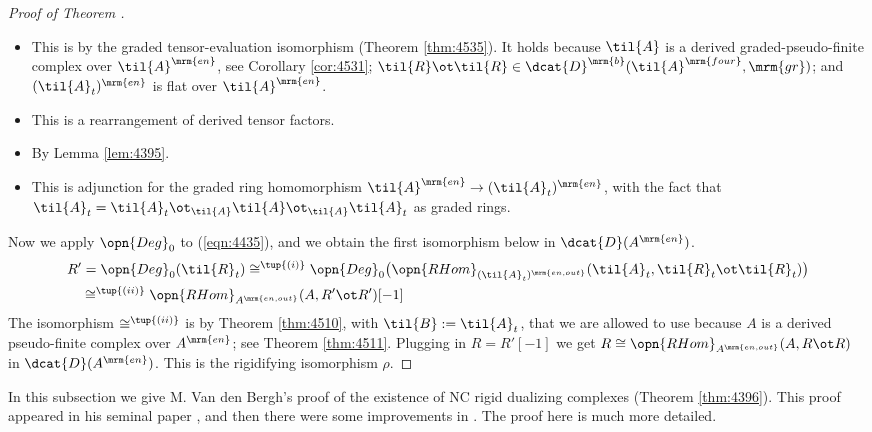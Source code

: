\begin{proof}[Proof of Theorem \tup{\ref{thm:4395}}]
\begin{itemize}
\item[$\cong^{2}$~:] This is by the graded tensor-evaluation 
isomorphism (Theorem \ref{thm:4535}). It holds because $\til{A}$ is
a derived graded-pseudo-finite complex over $\til{A}^{\mrm{en}}$,
see Corollary \ref{cor:4531}; 
$\til{R} \ot \til{R} \in \dcat{D}^{\mrm{b}}(\til{A}^{\mrm{four}}, \mrm{gr})$;
and $(\til{A}_t)^{\mrm{en}}$ is flat over $\til{A}^{\mrm{en}}$.

\item[$\cong^{3}$~:] This is a rearrangement of derived tensor factors. 

\item[$\cong^{4}$~:] By Lemma \ref{lem:4395}. 

\item[$\cong^{5}$~:] This is adjunction for the graded ring homomorphism 
$\til{A}^{\mrm{en}} \to (\til{A}_t)^{\mrm{en}}$, with the fact that 
$\til{A}_t = \til{A}_t \ot_{\til{A}} \til{A} \ot_{\til{A}} \til{A}_t$ as graded 
rings.
\end{itemize}

Now we apply $\opn{Deg}_0$ to (\ref{eqn:4435}), 
and we obtain the first isomorphism below in $\dcat{D}(A^{\mrm{en}})$.
\begin{equation} \label{eqn:4436}
\begin{aligned}
& 
R' = \opn{Deg}_0(\til{R}_t) \cong^{\tup{(i)}} 
\opn{Deg}_0 \bigl( 
\opn{RHom}_{(\til{A}_t)^{\mrm{en, out}}} (\til{A}_t, 
\til{R}_t \ot \til{R}_t) \bigr) 
\\ & \quad 
\cong^{\tup{(ii)}} \opn{RHom}_{A^{\mrm{en, out}}} (A, R' \ot R')[-1]
\end{aligned}
\end{equation}
The isomorphism $\cong^{\tup{(ii)}}$ is by Theorem \ref{thm:4510}, with 
$\til{B} := \til{A}_t$, that we are allowed to use because $A$ is a derived 
pseudo-finite complex over $A^{\mrm{en}}$; see Theorem \ref{thm:4511}. 
Plugging in $R = R'[-1]$ we get 
$R \cong \opn{RHom}_{A^{\mrm{en, out}}}(A, R \ot R)$
in $\dcat{D}(A^{\mrm{en}})$. This is the rigidifying isomorphism $\rho$.
\end{proof}




\label{subsec:Fil-exit-R-NCDC}

In this subsection we give M. Van den Bergh's proof of the existence of NC 
rigid dualizing complexes (Theorem \ref{thm:4396}). This proof appeared in his 
seminal paper \cite{VdB}, and then there were some improvements in 
\cite{YeZh1}. The proof here is much more detailed. 

